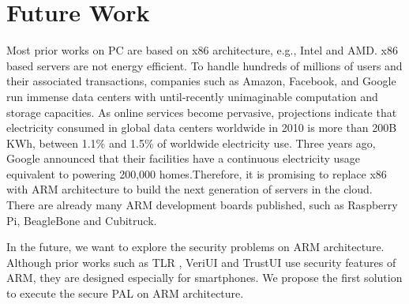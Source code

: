 \section{Future Work}
\label{sec:future}

Most prior works on PC are based on x86 architecture, e.g., Intel and AMD. x86
based servers are not energy efficient. To handle hundreds of millions of users
and their associated transactions, companies such as Amazon, Facebook, and
Google run immense data centers with until-recently unimaginable computation and
storage capacities. As online services become pervasive, projections indicate
that electricity consumed in global data centers worldwide in 2010 is more than
200B KWh, between 1.1\% and 1.5\% of worldwide electricity use. Three years ago,
Google announced that their facilities have a continuous electricity usage
equivalent to powering 200,000 homes.Therefore, it is promising to replace x86
with ARM architecture to build the next generation of servers in the cloud.
There are already many ARM development boards published, such as Raspberry Pi,
BeagleBone and Cubitruck. 

In the future, we want to explore the
security problems on ARM architecture. Although prior works such as TLR
\cite{TLR}, VeriUI \cite{VeriUI} and TrustUI \cite{TrustUI} use security
features of ARM, they are designed especially for smartphones. We propose the
first solution to execute the secure PAL on ARM architecture. 
